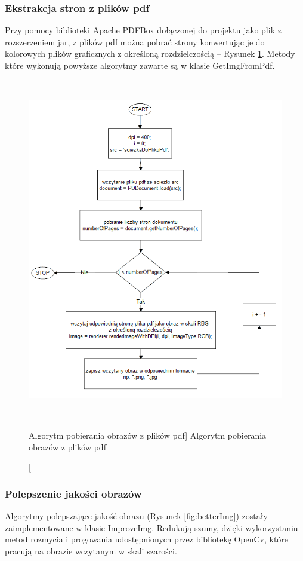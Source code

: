 \documentclass[a4paper,12pt]{article}
\newcommand\spacingIndent{2.2em}
\begin{document}
	\subsubsection{Ekstrakcja stron z plików pdf}
		\hspace{\spacingIndent} Przy pomocy biblioteki Apache PDFBox dołączonej do projektu jako plik z rozszerzeniem jar, z plików pdf można pobrać strony konwertując je do kolorowych plików graficznych z określoną rozdzielczością -- Rysunek \ref{fig:fromPdf}. Metody które wykonują powyższe algorytmy zawarte są w klasie GetImgFromPdf.

        
		\begin{figure}[!ht]  
			\begin{center}
				\includegraphics[height=15cm]{image//algorithm//getImgFromPdf.png}%
			\end{center}
			\caption
    			[Algorytm pobierania obrazów z plików pdf]  
	    		{Algorytm pobierania obrazów z plików pdf}  
	    		\label{fig:fromPdf}
		\end{figure}
		\newpage
		\subsubsection{Polepszenie jakości obrazów}
			\hspace{\spacingIndent} Algorytmy polepszające jakość obrazu (Rysunek \ref{fig:betterImg}) zostały zaimplementowane w klasie           ImproveImg. Redukują szumy, dzięki wykorzystaniu metod rozmycia i        progowania udostępnionych przez bibliotekę OpenCv, które pracują na         obrazie wczytanym w skali szarości.  
			
\end{document}
